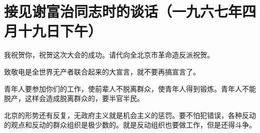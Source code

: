 \section[接见谢富治同志时的谈话（一九六七年四月十九日下午）]{接见谢富治同志时的谈话（一九六七年四月十九日下午）}


我祝贺你，祝贺这次大会的成功。请代向全北京市革命造反派祝贺。

致敬电是全世界无产者联合起来的大宣言，就不要再搞宣言了。

青年人要参加你们的工作，使前辈人不脱离群众，使青年人得到锻炼。青年人不能脱产，这样会造成脱离群众的，要半官半民。

北京的形势还有反复，无政府主义就是机会主义的惩罚。要不怕犯错误，各种反动的观点和反动的群众组织是极少数的。就是反动组织也要做工作，但是还得斗争。

